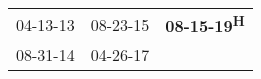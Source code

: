 \begin{supertabular}{lll}
 04-13-13\textsuperscript{} &  08-23-15\textsuperscript{} &  \textbf{08-15-19\textsuperscript{H}} \\
 08-31-14\textsuperscript{} &  04-26-17\textsuperscript{} &                                       \\
\end{supertabular}
